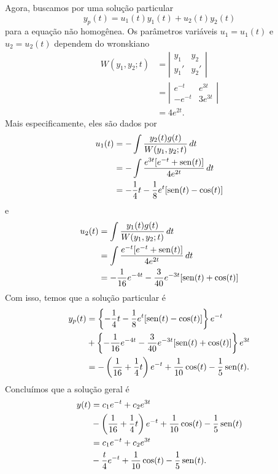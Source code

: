 \begin{resol}
  Agora, buscamos por uma solução particular
  \begin{equation}
    y_p(t) = u_1(t)y_1(t) + u_2(t)y_2(t)
  \end{equation}
  para a equação não homogênea. Os parâmetros variáveis $u_1 = u_1(t)$ e $u_2 = u_2(t)$ dependem do wronskiano
  \begin{align}
    W(y_1,y_2;t) &= \left|
                   \begin{matrix}
                     y_1 & y_2 \\
                     y_1' & y_2'
                   \end{matrix}
                            \right| \\
                 &= \left|
                   \begin{matrix}
                     e^{-t} & e^{3t} \\
                     -e^{-t} & 3e^{3t}
                   \end{matrix}
                               \right| \\
                 &= 4e^{2t}.
  \end{align}
  Mais especificamente, eles são dados por
  \begin{align}
    u_1(t) &= -\int \frac{y_2(t)g(t)}{W(y_1,y_2;t)}\,dt \\
           &= -\int \frac{e^{3t}[e^{-t} + \operatorname{sen}(t)]}{4e^{2t}}\,dt \\
           &= -\frac{1}{4}t - \frac{1}{8}e^{t}[\operatorname{sen}(t) - \cos(t)]
  \end{align}
  e
  \begin{align}
    u_2(t) &= \int \frac{y_1(t)g(t)}{W(y_1,y_2;t)}\,dt \\
           &= \int \frac{e^{-t}[e^{-t} + \operatorname{sen}(t)]}{4e^{2t}}\,dt \\
           &= -\frac{1}{16}e^{-4t} - \frac{3}{40}e^{-3t}[\operatorname{sen}(t) + \cos(t)]
  \end{align}
  Com isso, temos que a solução particular é
  \begin{align}
    y_p(t) &= \left\{-\frac{1}{4}t - \frac{1}{8}e^{t}[\operatorname{sen}(t) - \cos(t)]\right\}e^{-t} \\
           &+ \left\{-\frac{1}{16}e^{-4t} - \frac{3}{40}e^{-3t}[\operatorname{sen}(t) + \cos(t)]\right\}e^{3t} \\
           &= -\left(\frac{1}{16}+\frac{1}{4}t\right)e^{-t} + \frac{1}{10}\cos(t) - \frac{1}{5}\operatorname{sen}(t).
  \end{align}
  Concluímos que a solução geral é
  \begin{align}
    y(t) &= c_1e^{-t} + c_2e^{3t} \\
         &- \left(\frac{1}{16}+\frac{1}{4}t\right)e^{-t} + \frac{1}{10}\cos(t) - \frac{1}{5}\operatorname{sen}(t) \\
         &= c_1e^{-t} + c_2e^{3t} \\
         &- \frac{t}{4}e^{-t} + \frac{1}{10}\cos(t) - \frac{1}{5}\operatorname{sen}(t).
  \end{align}
\end{resol}

